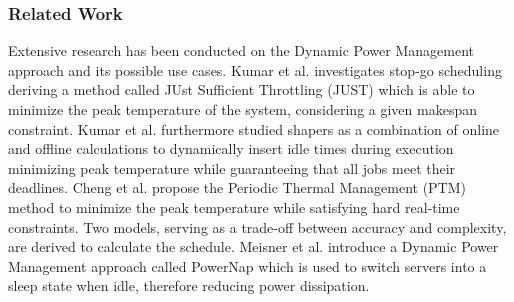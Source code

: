 \subsubsection{Related Work}
Extensive research has been conducted on the Dynamic Power Management approach and its possible use cases. Kumar et al. \cite{Kumar2011} investigates stop-go scheduling deriving a method called JUst Sufficient Throttling (JUST) which is able to minimize the peak temperature of the system, considering a given makespan constraint. Kumar et al. \cite{ACMSpecialInterestGrouponDesignAutomation.2011} furthermore studied shapers as a combination of online and offline calculations to dynamically insert idle times during execution minimizing peak temperature while guaranteeing that all jobs meet their deadlines. Cheng et al. \cite{Cheng2015} propose the Periodic Thermal Management (PTM) method to minimize the peak temperature while satisfying hard real-time constraints. Two models, serving as a trade-off between accuracy and complexity, are derived to calculate the schedule.  Meisner et al. \cite{Meisner} introduce a Dynamic Power Management approach called PowerNap which is used to switch servers into a sleep state when idle, therefore reducing power dissipation.
